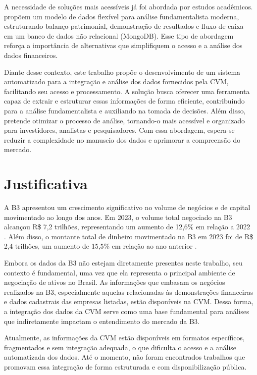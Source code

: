 \documentclass[recuosum=1.5cm]{iftex2024}
\begin{document}
A necessidade de soluções mais acessíveis já foi abordada por estudos acadêmicos. \cite{deAraujo:2021:modeloDados} propõem um modelo de dados flexível para análise fundamentalista moderna, estruturando balanço patrimonial, demonstração de resultados e fluxo de caixa em um banco de dados não relacional (MongoDB). Esse tipo de abordagem reforça a importância de alternativas que simplifiquem o acesso e a análise dos dados financeiros.


Diante desse contexto, este trabalho propõe o desenvolvimento de um sistema automatizado para a integração e análise dos dados fornecidos pela CVM, facilitando seu acesso e processamento. A solução busca oferecer uma ferramenta capaz de extrair e estruturar essas informações de forma eficiente, contribuindo para a análise fundamentalista e auxiliando na tomada de decisões. Além disso, pretende otimizar o processo de análise, tornando-o mais acessível e organizado para investidores, analistas e pesquisadores. Com essa abordagem, espera-se reduzir a complexidade no manuseio dos dados e aprimorar a compreensão do mercado.

\section{Justificativa}
A B3 apresentou um crescimento significativo no volume de negócios e de capital movimentado ao longo dos anos. Em 2023, o volume total negociado na B3 alcançou R\$ 7,2 trilhões, representando um aumento de 12,6\% em relação a 2022 \cite{b3:2023:investidores}. Além disso, o montante total de dinheiro movimentado na B3 em 2023 foi de R\$ 2,4 trilhões, um aumento de 15,5\% em relação ao ano anterior \cite{b3:2023:investidores}.

Embora os dados da B3 não estejam diretamente presentes neste trabalho, seu contexto é fundamental, uma vez que ela representa o principal ambiente de negociação de ativos no Brasil. As informações que embasam os negócios realizados na B3, especialmente aquelas relacionadas às demonstrações financeiras e dados cadastrais das empresas listadas, estão disponíveis na CVM. Dessa forma, a integração dos dados da CVM serve como uma base fundamental para análises que indiretamente impactam o entendimento do mercado da B3.

Atualmente, as informações da CVM estão disponíveis em formatos específicos, fragmentados e sem integração adequada, o que dificulta o acesso e a análise automatizada dos dados. Até o momento, não foram encontrados trabalhos que promovam essa integração de forma estruturada e com disponibilização pública.
\end{document}
